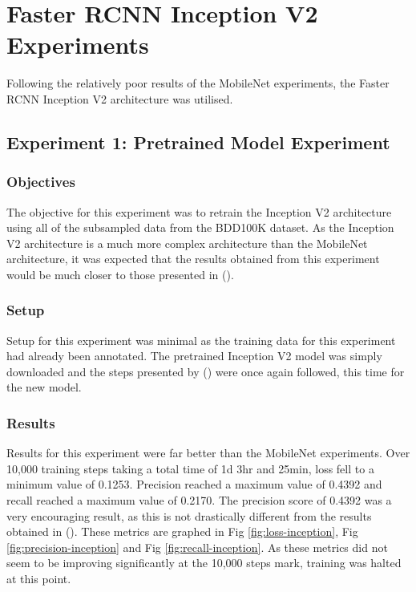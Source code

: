 \documentclass[12pt]{report}
\begin{document}
\newpage
\section{Faster RCNN Inception V2 Experiments}
\begin{flushleft}
Following the relatively poor results of the MobileNet experiments, the Faster RCNN Inception V2 architecture was utilised.
\end{flushleft}

\subsection{Experiment 1: Pretrained Model Experiment}
\subsubsection{Objectives}
\begin{flushleft}
The objective for this experiment was to retrain the Inception V2 architecture using all of the subsampled data from the BDD100K dataset. As the Inception V2 architecture is a much more complex architecture than the MobileNet architecture, it was expected that the results obtained from this experiment would be much closer to those presented in (\cite{yu2018bdd100k}).
\end{flushleft}

\subsubsection{Setup}
\begin{flushleft}
Setup for this experiment was minimal as the training data for this experiment had already been annotated. The pretrained Inception V2 model was simply downloaded and the steps presented by (\cite{tutorial}) were once again followed, this time for the new model.
\end{flushleft}

\subsubsection{Results}
\begin{flushleft}
Results for this experiment were far better than the MobileNet experiments. Over 10,000 training steps taking a total time of 1d 3hr and 25min, loss fell to a minimum value of 0.1253. Precision reached a maximum value of 0.4392 and recall reached a maximum value of 0.2170. The precision score of 0.4392 was a very encouraging result, as this is not drastically different from the results obtained in (\cite{yu2018bdd100k}). These metrics are graphed in Fig \ref{fig:loss-inception}, Fig \ref{fig:precision-inception} and Fig \ref{fig:recall-inception}. As these metrics did not seem to be improving significantly at the 10,000 steps mark, training was halted at this point.
\end{flushleft}
\end{document}
